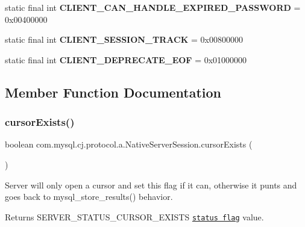 \begin{DoxyCompactItemize}
static final int {\bfseries C\+L\+I\+E\+N\+T\+\_\+\+C\+A\+N\+\_\+\+H\+A\+N\+D\+L\+E\+\_\+\+E\+X\+P\+I\+R\+E\+D\+\_\+\+P\+A\+S\+S\+W\+O\+RD} = 0x00400000
\item 
\mbox{\label{classcom_1_1mysql_1_1cj_1_1protocol_1_1a_1_1_native_server_session_ae41eec1c6126a728c82a0bdc3a366b2b}} 
static final int {\bfseries C\+L\+I\+E\+N\+T\+\_\+\+S\+E\+S\+S\+I\+O\+N\+\_\+\+T\+R\+A\+CK} = 0x00800000
\item 
\mbox{\label{classcom_1_1mysql_1_1cj_1_1protocol_1_1a_1_1_native_server_session_af4354f6755982c57f502489b585eacb4}} 
static final int {\bfseries C\+L\+I\+E\+N\+T\+\_\+\+D\+E\+P\+R\+E\+C\+A\+T\+E\+\_\+\+E\+OF} = 0x01000000
\end{DoxyCompactItemize}


\subsection{Member Function Documentation}
\mbox{\label{classcom_1_1mysql_1_1cj_1_1protocol_1_1a_1_1_native_server_session_a9e04d0827dc182b812bde510a82952c1}} 
\subsubsection{\texorpdfstring{cursor\+Exists()}{cursorExists()}}
{\footnotesize\ttfamily boolean com.\+mysql.\+cj.\+protocol.\+a.\+Native\+Server\+Session.\+cursor\+Exists (\begin{DoxyParamCaption}{ }\end{DoxyParamCaption})}

Server will only open a cursor and set this flag if it can, otherwise it punts and goes back to mysql\+\_\+store\+\_\+results() behavior.

\begin{DoxyReturn}{Returns}
S\+E\+R\+V\+E\+R\+\_\+\+S\+T\+A\+T\+U\+S\+\_\+\+C\+U\+R\+S\+O\+R\+\_\+\+E\+X\+I\+S\+TS \href{http://dev.mysql.com/doc/internals/en/status-flags.html}{\tt status flag} value. 
\end{DoxyReturn}


